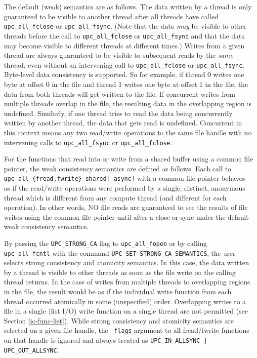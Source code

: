 \documentclass[12pt,titlepage]{article}
\newcounter{parnum}
\newcommand{\tab}{\textt{~~~~~~}}
\newcommand{\np}{
  \addtocounter{parnum}{1}
  \latex{\hspace{-2em}\makebox[2em][l]{\arabic{parnum}}}
  \html{{\bf {\arabic{parnum}}}\tab}}
\begin{document}
\np The default (weak) semantics are as follows. The data written by a thread is
only guaranteed to be visible to another thread after all threads have
called {\tt upc\_all\_fclose} or {\tt upc\_all\_fsync}. (Note that the data \textit{%
may} be visible to other threads before the call to {\tt upc\_all\_fclose} or
{\tt upc\_all\_fsync} and that the data may become visible to different
threads at different times.) Writes from a given thread are always
guaranteed to be visible to subsequent reads by the \textit{same} thread,
even without an intervening call to {\tt upc\_all\_fclose} or {\tt upc\_all\_fsync}.
Byte-level data consistency is supported. So for example, if thread 0
writes one byte at offset 0 in the file and thread 1 writes one byte at
offset 1 in the file, the data from both threads will get written to the
file. If concurrent writes from multiple threads overlap in the file, the
resulting data in the overlapping region is undefined. Similarly, if one
thread tries to read the data being concurrently written by another thread,
the data that gets read is undefined. Concurrent in this context means any
two read/write operations to the same file handle with no intervening calls
to {\tt upc\_all\_fsync} or {\tt upc\_all\_fclose}.

\np For the functions that read into or write from a shared buffer using a
common file pointer, the weak consistency semantics are defined as follows.
Each call to {\tt upc\_all\_\{fread,fwrite\}\_shared[\_async]} with a common file
pointer behaves as if the read/write operations were performed by a single,
distinct, anonymous thread which is different from any compute thread (and
different for each operation). In other words, NO file reads are guaranteed to
see the results of file writes using the common file pointer until after a close
or sync under the default weak consistency semantics.

\np By passing the {\tt UPC\_STRONG\_CA} flag to {\tt upc\_all\_fopen} or 
by calling {\tt upc\_all\_fcntl} with the command 
{\tt UPC\_SET\_STRONG\_CA\_SEMANTICS}, the user selects strong
consistency and atomicity semantics. In this case, the data written by a
thread is visible to other threads as soon as the file write on the calling
thread returns. In the case of writes from multiple threads to overlapping
regions in the file, the result would be as if the individual write function
from each thread occurred atomically in some (unspecified) order.
Overlapping writes to a file in a single (list I/O) write function on a
single thread are not permitted (see Section \ref{io-func-list}). While strong consistency
and atomicity semantics are selected on a given file handle, the {\tt
flags} argument to all fread/fwrite functions on that handle is ignored
and always treated as {\tt UPC\_IN\_ALLSYNC | UPC\_OUT\_ALLSYNC}.
\end{document}
